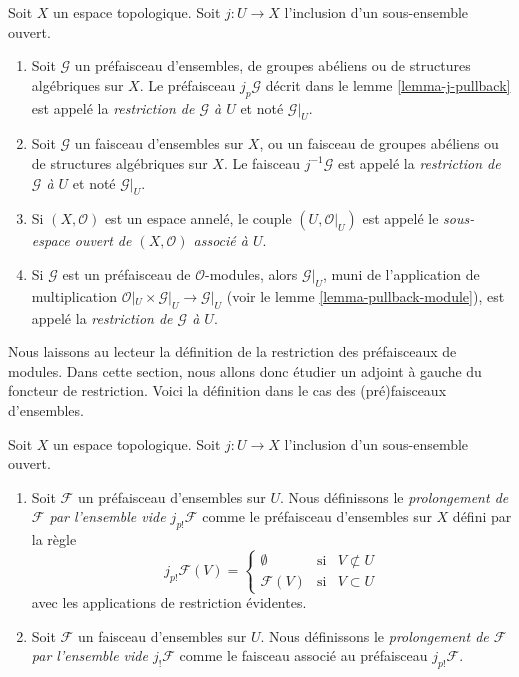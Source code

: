 \begin{definition}
\label{definition-restriction}
Soit $X$ un espace topologique.
Soit $j : U \to X$ l'inclusion d'un sous-ensemble ouvert.
\begin{enumerate}
\item Soit $\mathcal{G}$ un préfaisceau d'ensembles, de groupes abéliens ou de
structures algébriques sur $X$. Le préfaisceau $j_p\mathcal{G}$ décrit
dans le lemme \ref{lemma-j-pullback} est appelé
la {\it restriction de $\mathcal{G}$ à $U$} et noté $\mathcal{G}|_U$.
\item Soit $\mathcal{G}$ un faisceau d'ensembles sur $X$, ou un faisceau de groupes
abéliens ou de structures algébriques sur $X$. Le faisceau $j^{-1}\mathcal{G}$ est appelé
la {\it restriction de $\mathcal{G}$ à $U$} et noté $\mathcal{G}|_U$.
\item Si $(X, \mathcal{O})$ est un espace annelé, le couple
$(U, \mathcal{O}|_U)$ est appelé le
{\it sous-espace ouvert de $(X, \mathcal{O})$ associé à $U$}.
\item Si $\mathcal{G}$ est un préfaisceau de $\mathcal{O}$-modules,
alors $\mathcal{G}|_U$, muni de l'application de multiplication
$\mathcal{O}|_U \times \mathcal{G}|_U \to \mathcal{G}|_U$
(voir le lemme \ref{lemma-pullback-module}),
est appelé la {\it restriction de $\mathcal{G}$ à $U$}.
\end{enumerate}
\end{definition}

\noindent
Nous laissons au lecteur la définition de la restriction des préfaisceaux
de modules. Dans cette section, nous allons donc
étudier un adjoint à gauche du foncteur de restriction.
Voici la définition dans le cas des (pré)faisceaux
d'ensembles.

\begin{definition}
\label{definition-j-shriek}
Soit $X$ un espace topologique.
Soit $j : U \to X$ l'inclusion d'un sous-ensemble ouvert.
\begin{enumerate}
\item Soit $\mathcal{F}$ un préfaisceau d'ensembles sur $U$. Nous définissons
le {\it prolongement de $\mathcal{F}$ par l'ensemble vide $j_{p!}\mathcal{F}$}
comme le préfaisceau d'ensembles sur $X$ défini par la règle
$$
j_{p!}\mathcal{F}(V) =
\left\{
\begin{matrix}
\emptyset & \text{si} & V \not \subset U \\
\mathcal{F}(V) & \text{si} & V \subset U
\end{matrix}
\right.
$$
avec les applications de restriction évidentes.
\item Soit $\mathcal{F}$ un faisceau d'ensembles sur $U$. Nous définissons
le {\it prolongement de $\mathcal{F}$ par l'ensemble vide $j_!\mathcal{F}$}
comme le faisceau associé au préfaisceau $j_{p!}\mathcal{F}$.
\end{enumerate}
\end{definition}

